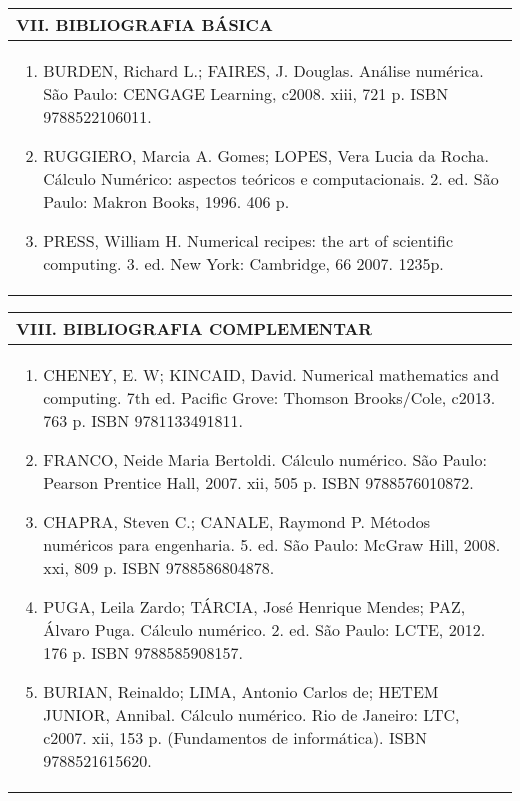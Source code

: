 \documentclass[12pt]{article}
\begin{document}

\begin{longtable}{|L{1.025\textwidth}|} \hline
%
{\bf VII. BIBLIOGRAFIA BÁSICA} \\ \hline
\begin{enumerate}
%
\item BURDEN, Richard L.; FAIRES, J. Douglas. Análise numérica. São Paulo: CENGAGE Learning, c2008. xiii, 721 p. ISBN 9788522106011.
\item RUGGIERO, Marcia A. Gomes; LOPES, Vera Lucia da Rocha. Cálculo Numérico: aspectos teóricos e computacionais. 2. ed. São Paulo: Makron Books, 1996. 406 p. 
\item PRESS, William H. Numerical recipes: the art of scientific computing. 3. ed. New York: Cambridge, 66 2007. 1235p. 
\end{enumerate}
 \\ \hline
\end{longtable}


\newpage

\begin{longtable}{|L{1.025\textwidth}|} \hline
%
{\bf VIII. BIBLIOGRAFIA COMPLEMENTAR} \\ \hline
\begin{enumerate}
\item CHENEY, E. W; KINCAID, David. Numerical mathematics and computing. 7th ed. Pacific Grove: Thomson Brooks/Cole, c2013. 763 p. ISBN 9781133491811.
\item FRANCO, Neide Maria Bertoldi. Cálculo numérico. São Paulo: Pearson Prentice Hall, 2007. xii, 505 p. ISBN 9788576010872.
\item CHAPRA, Steven C.; CANALE, Raymond P. Métodos numéricos para engenharia. 5. ed. São Paulo: McGraw Hill, 2008. xxi, 809 p. ISBN 9788586804878.
\item PUGA, Leila Zardo; TÁRCIA, José Henrique Mendes; PAZ, Álvaro Puga. Cálculo numérico. 2. ed. São Paulo: LCTE, 2012. 176 p. ISBN 9788585908157.
\item BURIAN, Reinaldo; LIMA, Antonio Carlos de; HETEM JUNIOR, Annibal. Cálculo numérico. Rio de Janeiro: LTC, c2007. xii, 153 p. (Fundamentos de informática). ISBN 9788521615620.
%
\end{enumerate}
 \\ \hline
\end{longtable}



\end{document}
